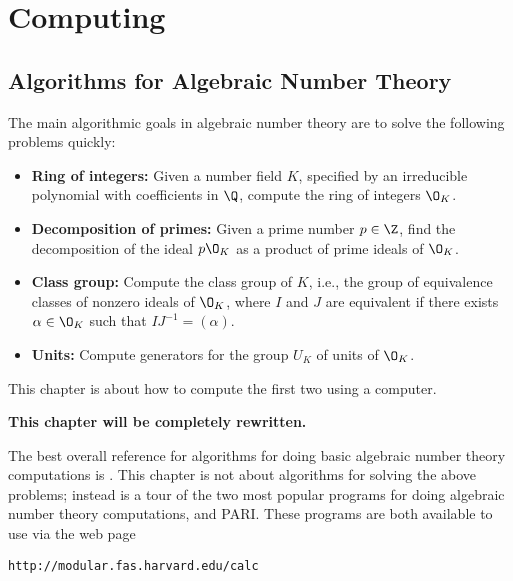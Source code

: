 \chapter{Computing}
\section{Algorithms for Algebraic Number Theory}
The main algorithmic goals in algebraic number theory 
are to solve the following problems quickly:
\begin{itemize}
\item {\bf Ring of integers:} Given a number field $K$, specified
by an irreducible polynomial with coefficients in $\Q$, 
compute the ring of integers $\O_K$.
\item  {\bf Decomposition of primes:} Given a prime number 
$p\in\Z$, find the decomposition of the ideal $p\O_K$ as a product 
of prime ideals of $\O_K$.
\item {\bf  Class group:} Compute the class group of $K$, i.e., the
group of equivalence classes of nonzero ideals of $\O_K$, where $I$ and $J$
are equivalent if there exists $\alpha \in \O_K$
such that $IJ^{-1}=(\alpha)$.
\item  {\bf Units:} Compute generators for the group $U_K$ 
of  units of $\O_K$.
\end{itemize}
This chapter is about how to compute the first two using a computer.
\begin{center}
{\bf\Large This chapter will be completely rewritten.}
\end{center}


The best overall reference for algorithms for doing basic algebraic
number theory computations is \cite{cohen:course_ant}.  This chapter
is not about algorithms for solving the above problems; instead is a
tour of the two most popular programs for doing algebraic number
theory computations, \magma{} and PARI.
These programs are both available to use via the web page
\begin{center}
\verb|http://modular.fas.harvard.edu/calc|
\end{center}

